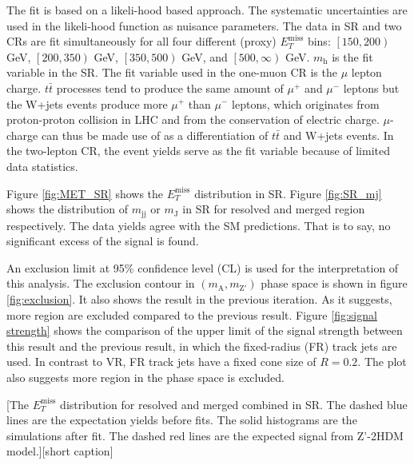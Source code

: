 \documentclass[class=NCU_thesis, crop=false]{standalone}
\begin{document}
	The fit is based on a likeli-hood based approach. The systematic uncertainties are used in the likeli-hood function as nuisance parameters. The data in SR and two CRs are fit simultaneously for all four different (proxy) $E_T^{\mathrm{miss}}$ bins: $\left[150, 200\right)$ GeV, $\left[200, 350\right)$ GeV, $\left[350, 500\right)$ GeV, and $\left[500, \infty \right)$ GeV. $m_{\mathrm{h}}$ is the fit variable in the SR. The fit variable used in the one-muon CR is the $\mu$ lepton charge. $t\bar{t}$ processes tend to produce the same amount of $\mu^+$ and $\mu^-$ leptons but the W+jets events produce more $\mu^+$ than $\mu^-$ leptons, which originates from proton-proton collision in LHC and from the conservation of electric charge. $\mu$-charge can thus be made use of as a differentiation of $t\bar{t}$ and W+jets events. In the two-lepton CR, the event yields serve as the fit variable because of limited data statistics.
	
	Figure \ref{fig:MET_SR} shows the $E_T^{\mathrm{miss}}$ distribution in SR. Figure \ref{fig:SR_mj} shows the distribution of $m_{\mathrm{jj}}$ or $m_{\mathrm{J}}$ in SR for resolved and merged region respectively. The data yields agree with the SM predictions. That is to say, no significant excess of the signal is found.
	
	An exclusion limit at 95\% confidence level (CL) is used for the interpretation of this analysis. The exclusion contour in $(m_{\mathrm{A}}, m_{\mathrm{Z'}})$ phase space is shown in figure \ref{fig:exclusion}. It also shows the result in the previous iteration. As it suggests, more region are excluded compared to the previous result. Figure \ref{fig:signal strength} shows the comparison of the upper limit of the signal strength between this result and the previous result, in which the fixed-radius (FR) track jets are used. In contrast to VR, FR track jets have a fixed cone size of $R = 0.2$. The plot also suggests more region in the phase space is excluded.
	
	[The $E_T^{\mathrm{miss}}$ distribution for resolved and merged combined in SR. The dashed blue lines are the expectation yields before fits. The solid histograms are the simulations after fit. The dashed red lines are the expected signal from Z'-2HDM model.][short caption]
	
\end{document}
